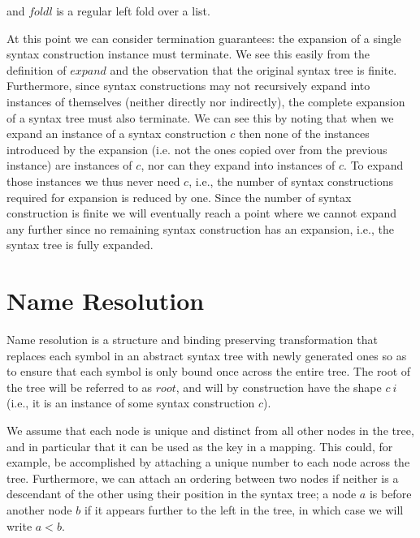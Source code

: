 \documentclass{kththesis}
\begin{document}
and $foldl$ is a regular left fold over a list.

At this point we can consider termination guarantees: the expansion of a single syntax construction instance must terminate. We see this easily from the definition of $expand$ and the observation that the original syntax tree is finite. Furthermore, since syntax constructions may not recursively expand into instances of themselves (neither directly nor indirectly), the complete expansion of a syntax tree must also terminate. We can see this by noting that when we expand an instance of a syntax construction $c$ then none of the instances introduced by the expansion (i.e. not the ones copied over from the previous instance) are instances of $c$, nor can they expand into instances of $c$. To expand those instances we thus never need $c$, i.e., the number of syntax constructions required for expansion is reduced by one. Since the number of syntax construction is finite we will eventually reach a point where we cannot expand any further since no remaining syntax construction has an expansion, i.e., the syntax tree is fully expanded.


\section{Name Resolution}

Name resolution is a structure and binding preserving transformation that replaces each symbol in an abstract syntax tree with newly generated ones so as to ensure that each symbol is only bound once across the entire tree. The root of the tree will be referred to as $root$, and will by construction have the shape $c~i$ (i.e., it is an instance of some syntax construction $c$).

We assume that each node is unique and distinct from all other nodes in the tree, and in particular that it can be used as the key in a mapping. This could, for example, be accomplished by attaching a unique number to each node across the tree. Furthermore, we can attach an ordering between two nodes if neither is a descendant of the other using their position in the syntax tree; a node $a$ is before another node $b$ if it appears further to the left in the tree, in which case we will write $a < b$.
\end{document}
